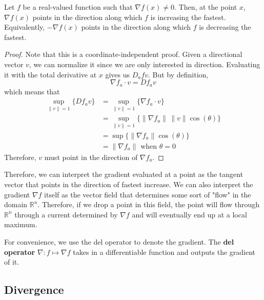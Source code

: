   \begin{theorem}
		Let $f$ be a real-valued function such that $\nabla f(x) \neq 0$. Then, at the point $x$, $\nabla f(x)$ points in the direction along which $f$ is increasing the fastest. Equivalently, $-\nabla f(x)$ points in the direction along which $f$ is decreasing the fastest. 
  \end{theorem}
  \begin{proof}
		Note that this is a coordinate-independent proof. Given a directional vector $v$, we can normalize it since we are only interested in direction. Evaluating it with the total derivative at $x$ gives us $D_a f v$. But by definition, 
		\begin{equation}
			\nabla f_a \cdot v = D f_a v
		\end{equation}
		which means that 
		\begin{align}
			\sup_{\|v\| = 1} \{D f_a v\} 
				& = \sup_{\|v\|=1} \{\nabla f_a \cdot v\} \\
				&  = \sup_{\|v\|=1} \{ \|\nabla f_a\| \, \|v\| \cos(\theta)\} \\
				& = \sup \{\|\nabla f_a\| \cos(\theta)\} \\
				& = \|\nabla f_a\| \text{ when } \theta = 0
		\end{align}
		Therefore, $v$ must point in the direction of $\nabla f_a$. 
  \end{proof}

  Therefore, we can interpret the gradient evaluated at a point as the tangent vector that points in the direction of fastest increase. We can also interpret the gradient $\nabla f$ itself as the vector field that determines some sort of "flow" in the domain $\mathbb{R}^n$. Therefore, if we drop a point in this field, the point will flow through $\mathbb{R}^n$ through a current determined by $\nabla f$ and will eventually end up at a local maximum. 

  \begin{definition}
		For convenience, we use the del operator to denote the gradient. The \textbf{del operator} $\nabla: f \mapsto \nabla f$ takes in a differentiable function and outputs the gradient of it. 
  \end{definition}

\subsection{Divergence}

